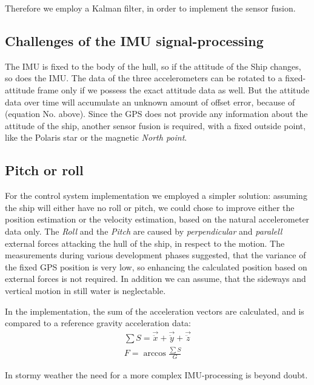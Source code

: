 Therefore we employ a Kalman filter, in order to implement the sensor fusion.

\subsection{Challenges of the IMU signal-processing}

The IMU is fixed to the body of the hull, so if the attitude of the Ship changes, so does the IMU. The data of the three accelerometers can be rotated to a fixed-attitude frame only if we possess the exact attitude data as well. But the attitude data over time will accumulate an unknown amount of offset error, because of (equation No. above).
Since the GPS does not provide any information about the attitude of the ship, another sensor fusion is required, with a fixed outside point, like the Polaris star or the magnetic \emph{North point}.

\subsection{Pitch or roll}

For the control system implementation we employed a simpler solution: assuming the ship will either have no roll or pitch, we could chose to improve either the position estimation or the velocity estimation, based on the natural accelerometer data only.
The \emph{Roll} and the \emph{Pitch} are caused by \emph{perpendicular} and \emph{paralell} external forces attacking the hull of the ship, in respect to the motion.
The measurements during various development phases suggested, that the variance of the fixed GPS position is very low, so enhancing the calculated position based on external forces is not required. In addition we can assume, that the sideways and vertical motion in still water is neglectable.

In the implementation, the sum of the acceleration vectors are calculated, and is compared to a reference gravity acceleration data:
\begin{align}
\sum S = \vec{\ddot{x}} + \vec{\ddot{y}} + \vec{\ddot{z}} \\
F = \arccos{\frac{\sum S}{G}}
\end{align}

In stormy weather the need for a more complex IMU-processing is beyond doubt.